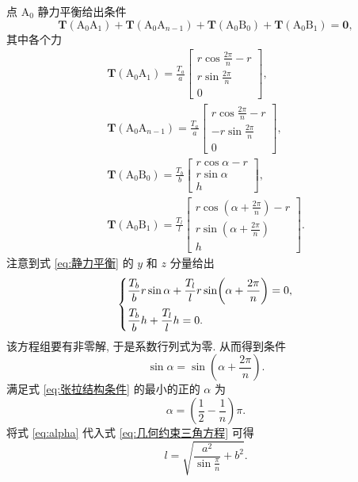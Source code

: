\documentclass{article}
\begin{document}
点 $\mathrm A_0$ 静力平衡给出条件
\begin{equation}
	\mathbf T\!\left(\mathrm A_0\mathrm A_1\right)+
	\mathbf T\!\left(\mathrm A_0\mathrm A_{n-1}\right)+
	\mathbf T\!\left(\mathrm A_0\mathrm B_0\right)+
	\mathbf T\!\left(\mathrm A_0\mathrm B_1\right)=\mathbf0,
	\label{eq:静力平衡}
\end{equation}
其中各个力
\begin{gather}
	\mathbf T\!\left(\mathrm A_0\mathrm A_1\right)=\frac{T_a}a
	\left[\begin{matrix}r\cos\frac{2\pi}n-r\\r\sin\frac{2\pi}n\\0\end{matrix}\right],\\
	\mathbf T\!\left(\mathrm A_0\mathrm A_{n-1}\right)=\frac{T_a}a
	\left[\begin{matrix}r\cos\frac{2\pi}n-r\\-r\sin\frac{2\pi}n\\0\end{matrix}\right],\\
	\mathbf T\!\left(\mathrm A_0\mathrm B_0\right)=\frac{T_b}b
	\left[\begin{matrix}r\cos\alpha-r\\r\sin\alpha\\h\end{matrix}\right],\\
	\mathbf T\!\left(\mathrm A_0\mathrm B_1\right)=\frac{T_l}l
	\left[\begin{matrix}r\cos\!\left(\alpha+\frac{2\pi}n\right)-r\\r\sin\!\left(\alpha+\frac{2\pi}n\right)\\h\end{matrix}\right].
\end{gather}
注意到式 \ref{eq:静力平衡} 的 $y$ 和 $z$ 分量给出
\begin{equation}
	\begin{dcases}
		\frac{T_b}br\sin\alpha+\frac{T_l}lr\sin\!\left(\alpha+\frac{2\pi}n\right)=0,\\
		\frac{T_b}bh+\frac{T_l}lh=0.
	\end{dcases}
\end{equation}
该方程组要有非零解, 于是系数行列式为零. 从而得到条件
\begin{equation}
	\sin\alpha=\sin\!\left(\alpha+\frac{2\pi}n\right).
	\label{eq:张拉结构条件}
\end{equation}
满足式 \ref{eq:张拉结构条件} 的最小的正的 $\alpha$ 为
\begin{equation}
	\alpha=\left(\frac12-\frac1n\right)\pi.
	\label{eq:alpha}
\end{equation}
将式 \ref{eq:alpha} 代入式 \ref{eq:几何约束三角方程} 可得
\begin{equation}
	l=\sqrt{\frac{a^2}{\sin\frac\pi n}+b^2}.
\end{equation}
\end{document}
